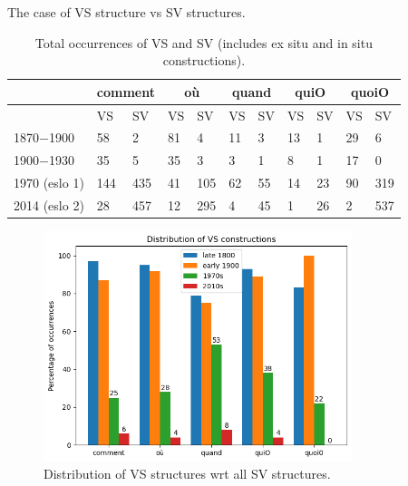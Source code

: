 \documentclass[fleqn,10pt]{wlscirep}
\begin{document}
The case of VS structure vs SV structures.

\begin{table}[H]
    \centering
    \small
    \begin{adjustbox}{width=\textwidth}
        \begin{tabular}{l|ll|ll|ll|ll|ll}
        {} & \multicolumn{2}{c}{comment}  & \multicolumn{2}{c}{où} & \multicolumn{2}{c}{quand} & \multicolumn{2}{c}{quiO}& \multicolumn{2}{c}{quoiO}\\
        \hline
        {} & VS & SV & VS & SV & VS & SV & VS & SV & VS & SV\\
        1870$-$1900 & 58 & 2 & 81 & 4 & 11 & 3 & 13 & 1 & 29 & 6\\
        1900$-$1930 & 35 & 5 & 35 & 3 & 3 & 1 & 8 & 1 & 17 & 0\\
        1970 (eslo 1) & 144 & 435 & 41 & 105 & 62 & 55 & 14 & 23 & 90 & 319 \\
        2014 (eslo 2) & 28 & 457 & 12 & 295 & 4 & 45 & 1 & 26 & 2 & 537 \\
        \hline
        \end{tabular}
    \end{adjustbox}
\caption{\label{tab:samp6}Total occurrences of VS and SV (includes ex situ and in situ constructions).}
\end{table}

\begin{figure}[h!]
    \centering
    \includegraphics[width=90mm]{images/VS.png}
    \caption{Distribution of VS structures wrt all SV structures.}
    \label{fig:boat1}
  \end{figure}
\end{document}
